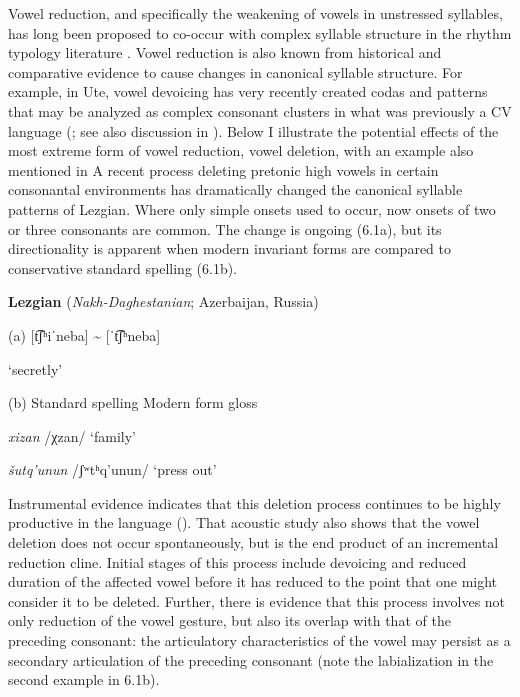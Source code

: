   Vowel reduction, and specifically the weakening of vowels in unstressed syllables, has long been proposed to co-occur with complex syllable structure in the rhythm typology literature \citep{Auer1993}. Vowel reduction is also known from historical and comparative evidence to cause changes in canonical syllable structure. For example, in Ute, vowel devoicing has very recently created codas and patterns that may be analyzed as complex consonant clusters in what was previously a CV language (\citealt{Givón2011}; see also discussion in ). Below I illustrate the potential effects of the most extreme form of vowel reduction, vowel deletion, with an example also mentioned in  A recent process deleting pretonic high vowels in certain consonantal environments has dramatically changed the canonical syllable patterns of Lezgian. Where only simple onsets used to occur, now onsets of two or three consonants are common. The change is ongoing (6.1a), but its directionality is apparent when modern invariant forms are compared to conservative standard spelling (6.1b).



\ea\label{ex:(6.1)}
  \textbf{Lezgian} (\textit{Nakh-Daghestanian}; Azerbaijan, Russia)



(a)  [t͡ʃʰiˈneba] {\textasciitilde} [ˈt͡ʃʰneba]



‘secretly’



(b)  Standard spelling  Modern form    gloss



\textit{xizan}      /χzan/      ‘family’



\textit{šutq’unun}    /ʃʷtʰq’unun/    ‘press out’



\citep[36-8]{Haspelmath1993}
\z



  Instrumental evidence indicates that this deletion process continues to be highly productive in the language (\citealt{ChitoranBabaliyeva2007}). That acoustic study also shows that the vowel deletion does not occur spontaneously, but is the end product of an incremental reduction cline. Initial stages of this process include devoicing and reduced duration of the affected vowel before it has reduced to the point that one might consider it to be deleted. Further, there is evidence that this process involves not only reduction of the vowel gesture, but also its overlap with that of the preceding consonant: the articulatory characteristics of the vowel may persist as a secondary articulation of the preceding consonant (note the labialization in the second example in 6.1b).



